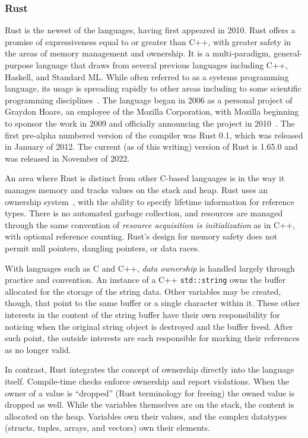 

\subsubsection{Rust}

Rust is the newest of the languages, having first appeared in 2010. Rust offers a promise of expressiveness equal to or greater than C++, with greater safety in the areas of memory management and ownership. It is a multi-paradigm, general-purpose language that draws from several previous languages including C++, Haskell, and Standard ML. While often referred to as a systems programming language, its usage is spreading rapidly to other areas including to some scientific programming disciplines~\cite{nature}. The language began in 2006 as a personal project of Graydon Hoare, an employee of the Mozilla Corporation, with Mozilla beginning to sponsor the work in 2009 and officially announcing the project in 2010~\cite{asay}. The first pre-alpha numbered version of the compiler was Rust 0.1, which was released in January of 2012. The current (as of this writing) version of Rust is 1.65.0 and was released in November of 2022.

An area where Rust is distinct from other C-based languages is in the way it manages memory and tracks values on the stack and heap. Rust uses an ownership system~\cite[Chapter~4]{programming}, with the ability to specify lifetime information for reference types. There is no automated garbage collection, and resources are managed through the same convention of \textit{resource acquisition is initialization} as in C++, with optional reference counting. Rust's design for memory safety does not permit null pointers, dangling pointers, or data races.

With languages such as C and C++, \textit{data ownership} is handled largely through practice and convention. An instance of a C++ \texttt{std::string} owns the buffer allocated for the storage of the string data. Other variables may be created, though, that point to the same buffer or a single character within it. These other interests in the content of the string buffer have their own responsibility for noticing when the original string object is destroyed and the buffer freed. After such point, the outside interests are each responsible for marking their references as no longer valid.

In contrast, Rust integrates the concept of ownership directly into the language itself. Compile-time checks enforce ownership and report violations. When the owner of a value is ``dropped'' (Rust terminology for freeing) the owned value is dropped as well. While the variables themselves are on the stack, the content is allocated on the heap. Variables own their values, and the complex datatypes (structs, tuples, arrays, and vectors) own their elements.

